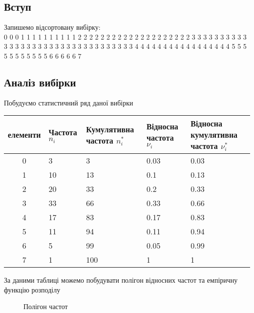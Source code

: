 \documentclass{article}
\begin{document}
\subsection{Вступ}
Запишемо відсортовану вибірку: \\
0 0 0 1 1 1 1 1 1 1 1 1 1 2 2 2 2 2 2 2 2 2 2 2 2 2 2 2 2 2 2 2 2 3 3 3 3 3 3 3 3 3 3 3 3 3 3 3 3 3
3 3 3 3 3 3 3 3 3 3 3 3 3 3 3 3 4 4 4 4 4 4 4 4 4 4 4 4 4 4 4 4 4 5 5 5 5 5 5 5 5 5 5 5 6 6 6 6 6 7
\subsection{Аналіз вибірки}
Побудуємо статистичний ряд даної вибірки
\begin{center}
    \begin{tabular}{|c||m{2cm}|m{2cm}|m{2cm}|m{2cm}|}
        \hline
        елементи & Частота $n_i$ & Кумулятивна частота $n^*_i$ & Відносна частота $\nu_i$ & Відносна
        кумулятивна частота $\nu^*_i$ \\
        \hline \hline
        0 & 3  & 3   & 0.03 & 0.03 \\
        \hline
        1 & 10 & 13  & 0.1  & 0.13 \\
        \hline
        2 & 20 & 33  & 0.2  & 0.33 \\
        \hline
        3 & 33 & 66  & 0.33 & 0.66 \\
        \hline
        4 & 17 & 83  & 0.17 & 0.83 \\
        \hline
        5 & 11 & 94  & 0.11 & 0.94 \\
        \hline
        6 & 5  & 99  & 0.05 & 0.99 \\
        \hline
        7 & 1  & 100 & 1   & 1 \\
        \hline
    \end{tabular}
    
\end{center}
\newpage
За даними таблиці можемо побудувати полігон відносних частот та емпіричну функцію розподілу 
\begin{figure}[H]
    \centering
    \caption{Полігон частот}
\end{figure}
\end{document}
